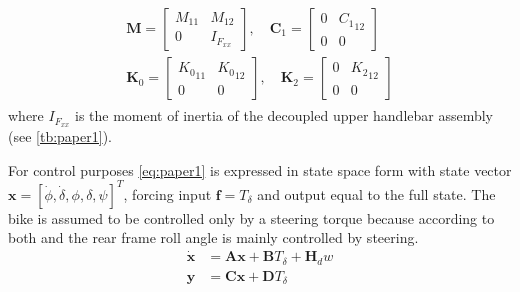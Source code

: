 \begin{align}
\begin{array}{l}{\mathbf{M}=\left[\begin{array}{cc}{{M}_{11}} & {{M}_{12}} \\ {0} & {I_{F_{xx}}}\end{array}\right], \quad \mathbf{C}_{1}=\left[\begin{array}{cc}{0} & {{C_1}_{\scriptscriptstyle 12}} \\ {0} & {0}\end{array}\right]} \\ {\mathbf{K}_{0}=\left[\begin{array}{cc}{{K_0}_{\scriptscriptstyle 11}} & {{K_0}_{\scriptscriptstyle 12}}  \\ {0} & {0}\end{array}\right], \quad \mathbf{K}_{2}=\left[\begin{array}{ccc}{0} & {{K_2}_{\scriptscriptstyle 12}} \\  {0} & {0}\end{array}\right]}\end{array}
\end{align}
where \ensuremath{I_{F_{xx}}} is the moment of inertia of the  decoupled upper handlebar assembly (see \cref{tb:paper1}).
 
For control purposes \cref{eq:paper1} is expressed in state space form with state vector \ensuremath{\mathbf{x}=[\dot{\phi}, \dot{\delta}, \phi, \delta, \psi]^{T}}, forcing input \ensuremath{\mathbf{f}=T_{\delta}} and output equal to the full state. The  bike is assumed to be controlled only by a steering torque because according to both \citet{moore2012human} and \citet{weir1973manual}  the rear frame roll angle is mainly
 controlled by steering. 
 \begin{align}
    \dot{\mathbf{x}} &=\mathbf{A} \mathbf{x}+\mathbf{B} T_\delta + \mathbf{H}_d w
     \label{eq:bikeEOM1}\\
    \mathbf{y}&=\mathbf{C} \mathbf{x}+\mathbf{D} T_\delta
    \label{eq:bikeEOM2}
\end{align}

